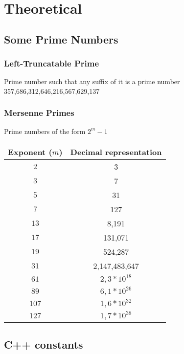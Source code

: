 \documentclass[11pt, a4paper, oneside]{book}
\begin{document}
\chapter{Theoretical}

\section{Some Prime Numbers}

\subsection{Left-Truncatable Prime}
\large{Prime number such that any suffix of it is a prime number} \\
\Large{357,686,312,646,216,567,629,137}

\subsection{Mersenne Primes}
\large{Prime numbers of the form $2^m-1$}
\begin{table}[h]
  \centering
  \begin{tabular}{|c|c|}
    \hline
    \textbf{Exponent ($m$)} & \textbf{Decimal representation} \\
    \hline
    \(2\) & 3 \\
    \hline
    \(3\) & 7 \\
    \hline
    \(5\) & 31 \\
    \hline
    \(7\) & 127 \\
    \hline
    \(13\) & 8,191 \\
    \hline
    \(17\) & 131,071 \\
    \hline
    \(19\) & 524,287 \\
    \hline
    \(31\) & 2,147,483,647 \\
    \hline
    \(61\) & $2,3 * 10^{18}$ \\
    \hline
    \(89\) & $6,1 * 10^{26}$ \\
    \hline
    \(107\) & $1,6 * 10^{32}$ \\
    \hline
    \(127\) & $1,7 * 10^{38}$ \\
    \hline
  \end{tabular}
\end{table}

\section{C++ constants}
\end{document}
